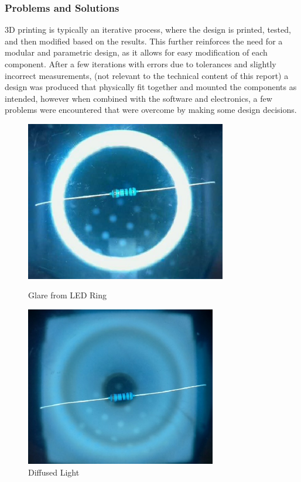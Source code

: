 \subsubsection{Problems and Solutions}
3D printing is typically an iterative process, where the design is printed, tested, and then modified based on the results.
This further reinforces the need for a modular and parametric design, as it allows for easy modification of each component.
After a few iterations with errors due to tolerances and slightly incorrect measurements, (not relevant to the technical content of this report)
a design was produced that physically fit together and mounted the components as intended, however when combined with the software
and electronics, a few problems were encountered that were overcome by making some design decisions.

\begin{figure}
    \begin{minipage}[t]{0.49\textwidth}
        \centering
        \includegraphics[width=\textwidth,height=7cm, keepaspectratio]{imgs/design/ringlight.jpg}
        \caption{Glare from LED Ring}
        \label{fig:glare}
    \end{minipage}
    \hfill
    \begin{minipage}[t]{0.49\textwidth}
        \centering
        \includegraphics[width=\textwidth,height=7cm, keepaspectratio]{imgs/design/diffusedlight.jpg}
        \caption{Diffused Light}
        \label{fig:diffusedlight}
    \end{minipage}
\end{figure}

